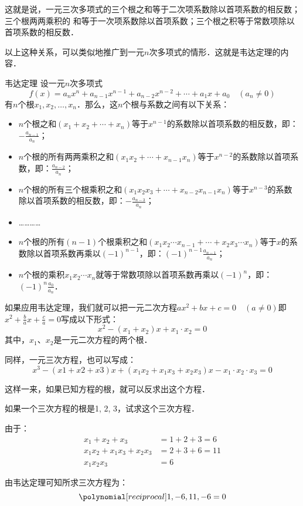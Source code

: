 这就是说，一元三次多项式的三个根之和等于二次项系数除以首项系数的相反数；三个根两两乘积的
和等于一次项系数除以首项系数；三个根之积等于常数项除以首项系数的相反数．

以上这种关系，可以类似地推广到一元$n$次多项式的情形．这就是韦达定理的内容．

\begin{blk}{韦达定理}
设一元$n$次多项式$$f(x)=a_nx^n+a_{n-1}x^{n-1}+a_{n-2}x^{n-2}+\cdots+a_1x+a_0\quad (a_n\ne 0)$$
有$n$个根$x_1,x_2,\ldots,x_n$．那么，这$n$个根与系数之间有以下关系：
\begin{itemize}
    \item $n$个根之和$(x_1+x_2+\cdots+x_n)$等于$x^{n-1}$的系数除以首项系数的相反数，即：$
    -\frac{a_{n-1}}{a_n}$；
    \item $n$个根的所有两两乘积之和$(x_1x_2+\cdots+x_{n-1}x_n)$等于$x^{n-2}$的系数除以首项系数，即：$
    \frac{a_{n-2}}{a_n}$；
    \item $n$个根的所有三个根乘积之和$(x_1x_2x_3+\cdots+x_{n-2}x_{n-1}x_n)$等于$x^{n-3}$的系数除以首项系数的相反数，即：$-\frac{a_{n-3}}{a_n}$；
    \item …………
    \item $n$个根的所有$(n-1)$个根乘积之和$(x_1x_2\cdots x_{n-1} +\cdots+ x_2x_3\cdots x_n)$等于$x$的系数除以首项系数再乘以$(-1)^{n-1}$，即：$ (-1)^{n-1}\frac{a_{n-1}}{a_n}$；
    \item $n$个根的乘积$x_1x_2\cdots x_n$就等于常数项除以首项系数再乘以$(-1)^{n}$，即：$ (-1)^{n}\frac{a_{0}}{a_n}$．
\end{itemize}
\end{blk}

如果应用韦达定理，我们就可以把一元二次方程$ax^2+bx+c=0\quad (a\ne 0)$即 $x^2+\frac{b}{a}x+\frac{c}{a}=0$写成以下形式：
\[x^2- (x_1+x_2) x+x_1\cdot x_2=0\]
其中，$x_1$、$x_2$是一元二次方程的两个根．

同样，一元三次方程，也可以写成：
\[x^3- (x1+x2+x3) x+ (x_1x_2+x_1x_3+x_2x_3) x
-x_1\cdot x_2\cdot x_3=0\]

这样一来，如果已知方程的根，就可以反求出这个方程．

\begin{example}
    如果一个三次方程的根是1, 2, 3，试求这个三次方程．
\end{example}

\begin{solution}
由于：\[\begin{split}
    x_1+x_2+x_3 &=1+2+3=6\\
    x_1x_2+x_1x_3+x_2x_3&=2+3+6=11\\
    x_1x_2x_3&=6
\end{split}\]

由韦达定理可知所求三次方程为：
\[\poly{1,-6,11,-6}=0\]
\end{solution}

